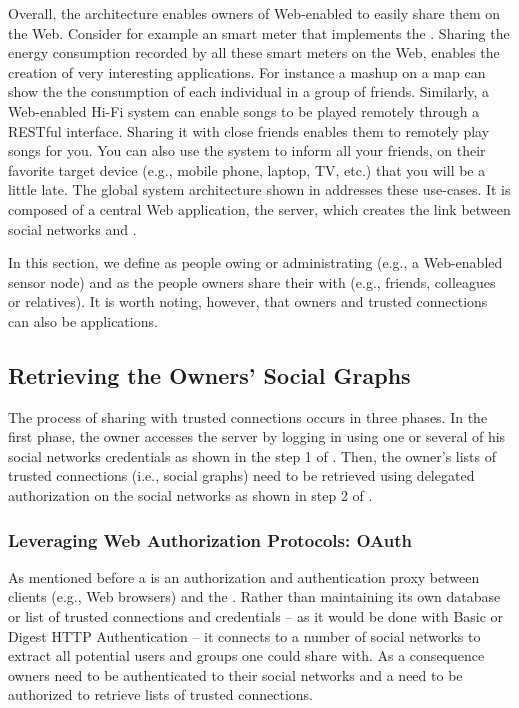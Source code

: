 Overall, the architecture enables owners of Web-enabled \sts{} to easily share them on the Web. Consider for example an smart meter that implements the \devLayer{}. Sharing the energy consumption recorded by all these smart meters on the Web, enables the creation of very interesting applications. For instance a mashup on a map can show the the consumption of each individual in a group of friends. Similarly, a Web-enabled Hi-Fi system can enable songs to be played remotely through a RESTful interface. Sharing it with close friends enables them to remotely play songs for you. You can also use the system to inform all your friends, on their favorite target device (e.g., mobile phone, laptop, TV, etc.) that you will be a little late. The global system architecture shown in  addresses these use-cases. It is composed of a central Web application, the \sac{} server, which creates the link between social networks and \sts{}. 

In this section, we define  as people owing or administrating \sts{} (e.g., a Web-enabled sensor node) and  as the people owners share their \sts{} with (e.g., friends, colleagues or relatives). It is worth noting, however, that owners and trusted connections can also be applications. 

\subsection{Retrieving the Owners' Social Graphs}
The process of sharing \sts{} with trusted connections occurs in three phases. In the first phase, the owner accesses the \sac{} server by logging in using one or several of his social networks credentials as shown in the step 1 of . Then, the owner's lists of trusted connections (i.e., social graphs) need to be retrieved using delegated authorization on the social networks as shown in step 2 of .


\subsubsection{Leveraging Web Authorization Protocols: OAuth}
As mentioned before a \sac{} is an authorization and authentication proxy between clients (e.g., Web browsers) and the \sts{}. Rather than maintaining its own database or list of trusted connections and credentials -- as it would be done with Basic or Digest HTTP Authentication -- it connects to a number of social networks to extract all potential users and groups one could share with. As a consequence owners need to be authenticated to their social networks and a \sac{} need to be authorized to retrieve lists of trusted connections.

